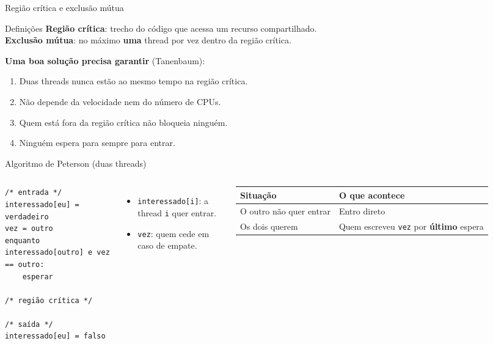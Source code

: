\documentclass[aspectratio=169]{beamer}
\begin{document}
\begin{frame}{Região crítica e exclusão mútua}
\begin{alertblock}{Definições}
\textbf{Região crítica}: trecho do código que acessa um recurso compartilhado.\\[0.3em]
\textbf{Exclusão mútua}: no máximo \textbf{uma} thread por vez dentro da região crítica.
\end{alertblock}

\textbf{Uma boa solução precisa garantir} (Tanenbaum):
\begin{enumerate}
    \item Duas threads nunca estão ao mesmo tempo na região crítica.
    \item Não depende da velocidade nem do número de CPUs.
    \item Quem está fora da região crítica não bloqueia ninguém.
    \item Ninguém espera para sempre para entrar.
\end{enumerate}
\end{frame}

\begin{frame}[fragile]{Algoritmo de Peterson (duas threads)}
\begin{columns}[T]
\begin{lstlisting}[style=terminal, basicstyle=\ttfamily\scriptsize\color{termfg}]
/* entrada */
interessado[eu] = verdadeiro
vez = outro
enquanto interessado[outro] e vez == outro:
    esperar

/* região crítica */

/* saída */
interessado[eu] = falso
\end{lstlisting}

\small
\begin{itemize}
    \item \texttt{interessado[i]}: a thread \texttt{i} quer entrar.
    \item \texttt{vez}: quem cede em caso de empate.
\end{itemize}

\vspace{0.3em}
\begin{tabular}{@{}R{2.4cm}R{3.2cm}@{}}
\toprule
\textbf{Situação} & \textbf{O que acontece} \\
\midrule
O outro não quer entrar & Entro direto \\
Os dois querem & Quem escreveu \texttt{vez} por \textbf{último} espera \\
\bottomrule
\end{tabular}
\end{columns}
\end{frame}
\end{document}
